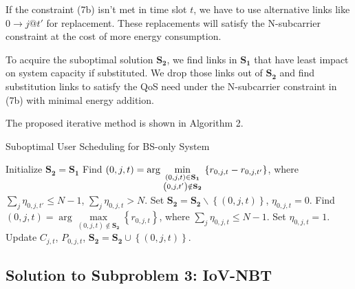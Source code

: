 \documentclass{ieeeaccess}
\begin{document}
If the constraint (7b) isn't met in time slot ${t}$, we have to use alternative links like $0 \to j@t'$ for replacement. These replacements will satisfy the N-subcarrier constraint at the cost of more energy consumption. 

To acquire the suboptimal solution ${{\mathbf{S}}_{\mathbf{2}}}$, we find links in ${{\mathbf{S}}_{\mathbf{1}}}$ that have least impact on system capacity if substituted. We drop those links out of ${{\mathbf{S}}_{\mathbf{2}}}$ and find substitution links to satisfy the QoS need under the N-subcarrier constraint in (7b) with minimal energy addition. 

The proposed iterative method is shown in Algorithm 2.

\begin{algorithm}[h]
\caption{Suboptimal User Scheduling for BS-only System}
\label{alg:1}
\begin{algorithmic}[1]
\STATE Initialize ${{\mathbf{S}}_{\mathbf{2}}}={{\mathbf{S}}_{\mathbf{1}}}$
  \STATE Find $\left( {0,j,t} \right) = \arg \mathop {\min }\limits_{\scriptstyle \left( {0,j,t} \right) \in {{\mathbf{S}}_{\mathbf{1}}} \atop
  \scriptstyle \left( {0,j,t'} \right) \notin {{\mathbf{S}}_{\mathbf{2}}}}  \left\{ {{r_{0,j,t}} - {r_{0,j,t'}}} \right\}$, where $\sum\limits_{j} {{\eta _{0,j,t'}}}  \le N - 1$, $\sum\limits_j {{\eta _{0,j,t}} > N} $.
  \STATE Set ${{\mathbf{S}}_{\mathbf{2}}}={{\mathbf{S}}_{\mathbf{2}}}\backslash \left\{ {\left( {0,j,t} \right)} \right\}$, ${\eta _{0,j,t}} = 0$.
    \STATE Find ${\left( {0,j,t} \right) = \arg \mathop {\max }\limits_{\left( {0,j,t} \right) \notin {{\mathbf{S}}_{\mathbf{2}}}} \left\{ {{r_{0,j,t}}} \right\}}$, where ${\sum\limits_j {{\eta _{0,j,t}}}  \le N - 1}$.
    \STATE Set ${\eta _{0,j,t}} = 1$.
    \STATE Update ${C_{j,t}}$, ${P_{0,j,t}}$, ${{\mathbf{S}}_{\mathbf{2}}}={{\mathbf{S}}_{\mathbf{2}}} \cup \left\{ {\left( {0,j,t} \right)} \right\}$.
  \ENDWHILE
\ENDWHILE
\end{algorithmic}
\end{algorithm}

\subsection{Solution to \textbf{Subproblem 3: IoV-NBT}}
\end{document}
